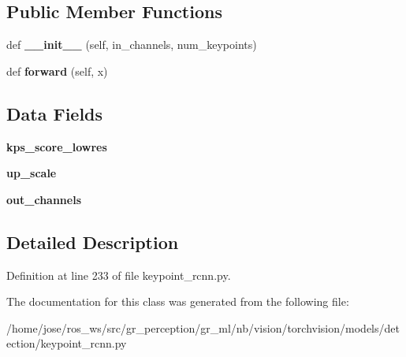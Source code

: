 \subsection*{Public Member Functions}
\begin{DoxyCompactItemize}
\item 
\mbox{\label{classtorchvision_1_1models_1_1detection_1_1keypoint__rcnn_1_1KeypointRCNNPredictor_af022b164a0e0b8e600d8cb0950bed36d}} 
def {\bfseries \+\_\+\+\_\+init\+\_\+\+\_\+} (self, in\+\_\+channels, num\+\_\+keypoints)
\item 
\mbox{\label{classtorchvision_1_1models_1_1detection_1_1keypoint__rcnn_1_1KeypointRCNNPredictor_ae4ac762d96823ab464a5a9795e676e82}} 
def {\bfseries forward} (self, x)
\end{DoxyCompactItemize}
\subsection*{Data Fields}
\begin{DoxyCompactItemize}
\item 
\mbox{\label{classtorchvision_1_1models_1_1detection_1_1keypoint__rcnn_1_1KeypointRCNNPredictor_afcf6a6cad7564180a5c8673e43a3b93d}} 
{\bfseries kps\+\_\+score\+\_\+lowres}
\item 
\mbox{\label{classtorchvision_1_1models_1_1detection_1_1keypoint__rcnn_1_1KeypointRCNNPredictor_a0382be6c01137b3f88728b37ef0f2fe4}} 
{\bfseries up\+\_\+scale}
\item 
\mbox{\label{classtorchvision_1_1models_1_1detection_1_1keypoint__rcnn_1_1KeypointRCNNPredictor_aec5d8e6ea16c1eab99f1f72b9c89eae9}} 
{\bfseries out\+\_\+channels}
\end{DoxyCompactItemize}


\subsection{Detailed Description}


Definition at line 233 of file keypoint\+\_\+rcnn.\+py.



The documentation for this class was generated from the following file\+:\begin{DoxyCompactItemize}
\item 
/home/jose/ros\+\_\+ws/src/gr\+\_\+perception/gr\+\_\+ml/nb/vision/torchvision/models/detection/keypoint\+\_\+rcnn.\+py\end{DoxyCompactItemize}

